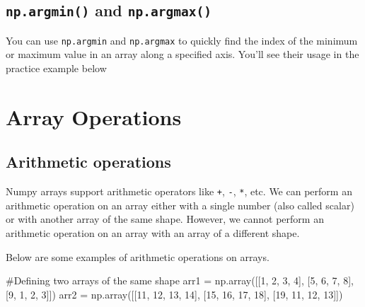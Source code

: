 \documentclass[
  letterpaper,
  DIV=11,
  numbers=noendperiod]{scrreprt}
\newenvironment{Shaded}{\begin{snugshade}}{\end{snugshade}}
\newcommand{\CommentTok}[1]{\textcolor[rgb]{0.37,0.37,0.37}{#1}}
\newcommand{\DecValTok}[1]{\textcolor[rgb]{0.68,0.00,0.00}{#1}}
\newcommand{\NormalTok}[1]{\textcolor[rgb]{0.00,0.23,0.31}{#1}}
\newcommand{\OperatorTok}[1]{\textcolor[rgb]{0.37,0.37,0.37}{#1}}
\begin{document}
\hypertarget{np.argmin-and-np.argmax}{%
\subsection{\texorpdfstring{\texttt{np.argmin()} and
\texttt{np.argmax()}}{np.argmin() and np.argmax()}}\label{np.argmin-and-np.argmax}}

You can use \texttt{np.argmin} and \texttt{np.argmax} to quickly find
the index of the minimum or maximum value in an array along a specified
axis. You'll see their usage in the practice example below

\hypertarget{array-operations}{%
\section{Array Operations}\label{array-operations}}

\hypertarget{arithmetic-operations}{%
\subsection{Arithmetic operations}\label{arithmetic-operations}}

Numpy arrays support arithmetic operators like \texttt{+}, \texttt{-},
\texttt{*}, etc. We can perform an arithmetic operation on an array
either with a single number (also called scalar) or with another array
of the same shape. However, we cannot perform an arithmetic operation on
an array with an array of a different shape.

Below are some examples of arithmetic operations on arrays.

\begin{Shaded}
\begin{Highlighting}[]
\CommentTok{\#Defining two arrays of the same shape}
\NormalTok{arr1 }\OperatorTok{=}\NormalTok{ np.array([[}\DecValTok{1}\NormalTok{, }\DecValTok{2}\NormalTok{, }\DecValTok{3}\NormalTok{, }\DecValTok{4}\NormalTok{], }
\NormalTok{                 [}\DecValTok{5}\NormalTok{, }\DecValTok{6}\NormalTok{, }\DecValTok{7}\NormalTok{, }\DecValTok{8}\NormalTok{], }
\NormalTok{                 [}\DecValTok{9}\NormalTok{, }\DecValTok{1}\NormalTok{, }\DecValTok{2}\NormalTok{, }\DecValTok{3}\NormalTok{]])}
\NormalTok{arr2 }\OperatorTok{=}\NormalTok{ np.array([[}\DecValTok{11}\NormalTok{, }\DecValTok{12}\NormalTok{, }\DecValTok{13}\NormalTok{, }\DecValTok{14}\NormalTok{], }
\NormalTok{                 [}\DecValTok{15}\NormalTok{, }\DecValTok{16}\NormalTok{, }\DecValTok{17}\NormalTok{, }\DecValTok{18}\NormalTok{], }
\NormalTok{                 [}\DecValTok{19}\NormalTok{, }\DecValTok{11}\NormalTok{, }\DecValTok{12}\NormalTok{, }\DecValTok{13}\NormalTok{]])}
\end{Highlighting}
\end{Shaded}
\end{document}
